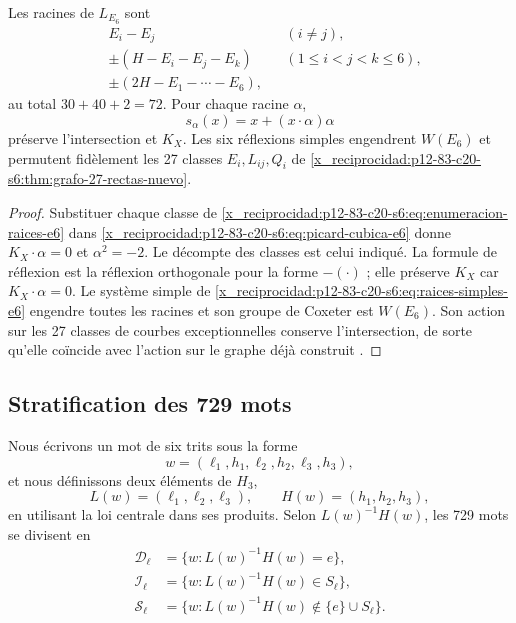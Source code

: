 \begin{proposition}
\label{x_reciprocidad:p12-83-c20-s6:prop:setenta-dos-raices-e6}
Les racines de \(L_{E_6}\) sont
\begin{equation}
 \begin{aligned}
 &E_i-E_j &&(i\ne j),\\
 &\pm(H-E_i-E_j-E_k) &&(1\le i<j<k\le6),\\
 &\pm(2H-E_1-\cdots-E_6),
 \end{aligned}
 \label{x_reciprocidad:p12-83-c20-s6:eq:enumeracion-raices-e6}
\end{equation}
au total \(30+40+2=72\). Pour chaque racine \(\alpha\),
\begin{equation}
 s_\alpha(x)=x+(x\cdot\alpha)\alpha
 \label{x_reciprocidad:p12-83-c20-s6:eq:reflexion-raiz-e6}
\end{equation}
préserve l’intersection et \(K_X\). Les six réflexions simples engendrent
\(W(E_6)\) et permutent fidèlement les 27 classes
\(E_i,L_{ij},Q_i\) de \cref{x_reciprocidad:p12-83-c20-s6:thm:grafo-27-rectas-nuevo}.
\end{proposition}

\begin{proof}
Substituer chaque classe de \cref{x_reciprocidad:p12-83-c20-s6:eq:enumeracion-raices-e6} dans \cref{x_reciprocidad:p12-83-c20-s6:eq:picard-cubica-e6} donne \(K_X\cdot\alpha=0\) et \(\alpha^2=-2\). Le décompte des classes est celui indiqué. La formule de réflexion est la réflexion orthogonale pour la forme \(-(\cdot)\) ; elle préserve \(K_X\) car \(K_X\cdot\alpha=0\). Le système simple de \cref{x_reciprocidad:p12-83-c20-s6:eq:raices-simples-e6} engendre toutes les racines et son groupe de Coxeter est \(W(E_6)\). Son action sur les 27 classes de courbes exceptionnelles conserve l'intersection, de sorte qu'elle coïncide avec l'action sur le graphe déjà construit \cite{x_reciprocidad:Manivel2005}.
\end{proof}

\subsection{Stratification des 729 mots}

Nous écrivons un mot de six trits sous la forme
\[
 w=(\ell_1,h_1,\ell_2,h_2,\ell_3,h_3),
\]
et nous définissons deux éléments de \(H_3\),
\[
 L(w)=(\ell_1,\ell_2,\ell_3),\qquad
 H(w)=(h_1,h_2,h_3),
\]
en utilisant la loi centrale dans ses produits. Selon
\(L(w)^{-1}H(w)\), les 729 mots se divisent en
\begin{align*}
 \mathcal D_\ell&=\{w:L(w)^{-1}H(w)=e\},\\
 \mathcal I_\ell&=\{w:L(w)^{-1}H(w)\in S_\ell\},\\
 \mathcal S_\ell&=\{w:L(w)^{-1}H(w)\notin\{e\}\cup S_\ell\}.
\end{align*}

